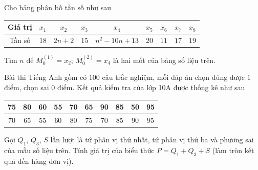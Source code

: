 \begin{ex}%
Cho bảng phân bố tần số như sau
\begin{longtable}{|c|c|c|c|c|c|c|c|c|}
\hline
Giá trị&$x_1$&$x_2$&$x_3$&$x_4$&$x_5$&$x_6$&$x_7$&$x_8$\\
\hline
Tần số&$18$&$2n+2$&$15$&$n^2-10n+13$&$20$&$11$&$17$&$19$\\
\hline
\end{longtable}
Tìm $n$ để $M_0^{(1)}=x_2$; $M_0^{(2)}=x_4$ là hai mốt của bảng số liệu trên.
\end{ex}
\begin{ex}%
Bài thi Tiếng Anh gồm có $100$ câu trắc nghiệm, mỗi đáp án chọn đúng được $1$ điểm, chọn sai $0$ điểm. Kết quả kiểm tra của lớp 10A được thống kê như sau 
\begin{longtable}{|c|c|c|c|c|c|c|c|c|c|}
\hline
75&80&60&55&70&65&90&85&50&95\\
\hline
70&65&55&60&80&75&70&85&90&95\\
\hline
\end{longtable}
Gọi $Q_1$, $Q_3$, $S$ lần lượt là tứ phân vị thứ nhất, tứ phân vị thứ ba và phương sai của mẫu số liệu trên. Tính giá trị của biểu thức $P=Q_1+Q_3+S$ (làm tròn kết quả đến hàng đơn vị).
\end{ex}

